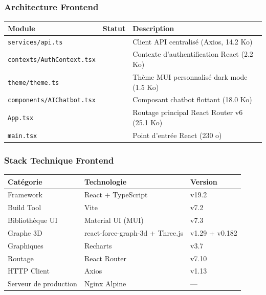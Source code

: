 \documentclass[12pt,a4paper]{article}
\newcommand{\cmark}{\textcolor{vert}{\ding{51}}}
\begin{document}
\subsubsection{Architecture Frontend}

\begin{center}
\renewcommand{\arraystretch}{1.3}
\begin{tabular}{|l|c|l|}
\hline
\rowcolor{bleu!15}
\textbf{Module} & \textbf{Statut} & \textbf{Description} \\
\hline
\texttt{services/api.ts} & \cmark & Client API centralisé (Axios, 14.2 Ko) \\
\hline
\texttt{contexts/AuthContext.tsx} & \cmark & Contexte d'authentification React (2.2 Ko) \\
\hline
\texttt{theme/theme.ts} & \cmark & Thème MUI personnalisé dark mode (1.5 Ko) \\
\hline
\texttt{components/AIChatbot.tsx} & \cmark & Composant chatbot flottant (18.0 Ko) \\
\hline
\texttt{App.tsx} & \cmark & Routage principal React Router v6 (25.1 Ko) \\
\hline
\texttt{main.tsx} & \cmark & Point d'entrée React (230 o) \\
\hline
\end{tabular}
\end{center}

\subsubsection{Stack Technique Frontend}

\begin{center}
\renewcommand{\arraystretch}{1.3}
\begin{tabular}{|l|l|l|}
\hline
\rowcolor{bleu!15}
\textbf{Catégorie} & \textbf{Technologie} & \textbf{Version} \\
\hline
Framework & React + TypeScript & v19.2 \\
\hline
Build Tool & Vite & v7.2 \\
\hline
Bibliothèque UI & Material UI (MUI) & v7.3 \\
\hline
Graphe 3D & react-force-graph-3d + Three.js & v1.29 + v0.182 \\
\hline
Graphiques & Recharts & v3.7 \\
\hline
Routage & React Router & v7.10 \\
\hline
HTTP Client & Axios & v1.13 \\
\hline
Serveur de production & Nginx Alpine & --- \\
\hline
\end{tabular}
\end{center}
\end{document}
